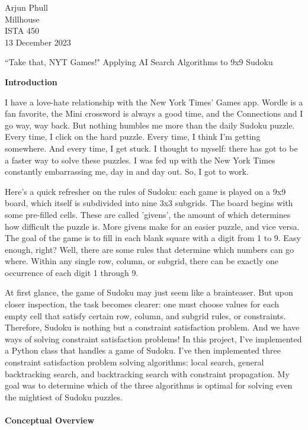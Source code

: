 \documentclass[12pt]{article}
\begin{document}
\begin{flushleft}
	Arjun Phull\\
	Millhouse\\
	ISTA 450\\
	13 December 2023
\end{flushleft}

\begin{center}
	``Take that, NYT Games!" Applying AI Search Algorithms to 9x9 Sudoku
\end{center}
\textbf{Introduction}

	I have a love-hate relationship with the New York Times' Games app. Wordle is a fan favorite, the Mini crossword is always a good time, and the Connections and I go way, way back. But nothing humbles me more than the daily Sudoku puzzle. Every time, I click on the hard puzzle. Every time, I think I'm getting somewhere. And every time, I get stuck. I thought to myself: there has got to be a faster way to solve these puzzles. I was fed up with the New York Times constantly embarrassing me, day in and day out. So, I got to work.

	Here's a quick refresher on the rules of Sudoku: each game is played on a 9x9 board, which itself is subdivided into nine 3x3 subgrids. The board begins with some pre-filled cells. These are called 'givens', the amount of which determines how difficult the puzzle is. More givens make for an easier puzzle, and vice versa. The goal of the game is to fill in each blank square with a digit from 1 to 9. Easy enough, right? Well, there are some rules that determine which numbers can go where. Within any single row, column, or subgrid, there can be exactly one occurrence of each digit 1 through 9.
	
	At first glance, the game of Sudoku may just seem like a brainteaser. But upon closer inspection, the task becomes clearer: one must choose values for each empty cell that satisfy certain row, column, and subgrid rules, or constraints. Therefore, Sudoku is nothing but a constraint satisfaction problem. And we have ways of solving constraint satisfaction problems! In this project, I've implemented a Python class that handles a game of Sudoku. I've then implemented three constraint satisfaction problem solving algorithms: local search, general backtracking search, and backtracking search with constraint propagation. My goal was to determine which of the three algorithms is optimal for solving even the mightiest of Sudoku puzzles.\\\\
\textbf{Conceptual Overview}
\end{document}
